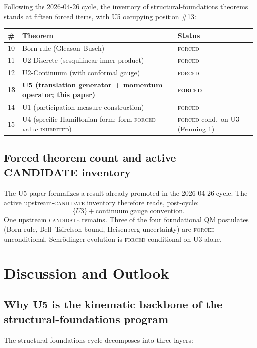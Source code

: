 \documentclass[11pt,a4paper]{article}
\begin{document}
Following the 2026-04-26 cycle, the inventory of structural-foundations theorems stands at fifteen forced items, with U5 occupying position \#13:

\begin{center}
\begin{tabular}{cll}
\hline
\# & Theorem & Status \\
\hline
10 & Born rule (Gleason--Busch) & \textsc{forced} \\
11 & U2-Discrete (sesquilinear inner product) & \textsc{forced} \\
12 & U2-Continuum (with conformal gauge) & \textsc{forced} \\
\textbf{13} & \textbf{U5 (translation generator + momentum operator; this paper)} & \textbf{\textsc{forced}} \\
14 & U1 (participation-measure construction) & \textsc{forced} \\
15 & U4 (specific Hamiltonian form; form-\textsc{forced}--value-\textsc{inherited}) & \textsc{forced} cond.\ on U3 (Framing 1) \\
\hline
\end{tabular}
\end{center}

\subsection{Forced theorem count and active CANDIDATE inventory}

The U5 paper formalizes a result already promoted in the 2026-04-26 cycle. The active upstream-\textsc{candidate} inventory therefore reads, post-cycle:
\[
\{U3\} + \text{continuum gauge convention.}
\]
One upstream \textsc{candidate} remains. Three of the four foundational QM postulates (Born rule, Bell--Tsirelson bound, Heisenberg uncertainty) are \textsc{forced}-unconditional. Schr\"odinger evolution is \textsc{forced} conditional on U3 alone.

\section{Discussion and Outlook}\label{sec:discussion}

\subsection{Why U5 is the kinematic backbone of the structural-foundations program}

The structural-foundations cycle decomposes into three layers:
\end{document}
